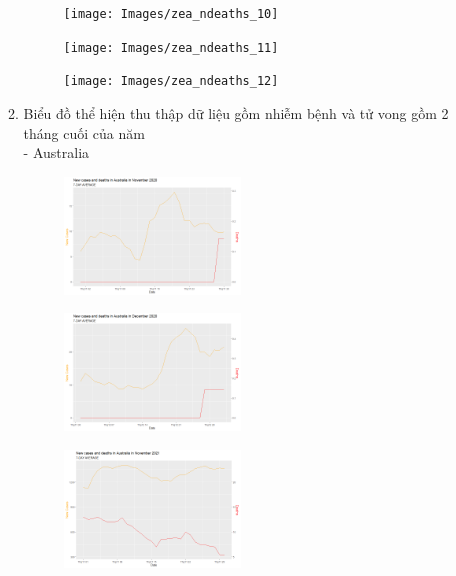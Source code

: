 \documentclass[a4paper]{article}
\theoremstyle{definition}
\begin{document}
\begin{enumerate}[i)]
\begin{enumerate}[1)]
		\begin{figure} [!htp]
  		\centering
  		\texttt{[image: Images/zea\_ndeaths\_10]}
		\end{figure}
		
		\begin{figure} [!htp]
  		\centering
  		\texttt{[image: Images/zea\_ndeaths\_11]}
		\end{figure}
		
		\begin{figure} [!htp]
  		\centering
  		\texttt{[image: Images/zea\_ndeaths\_12]}
		\end{figure}
    \item Biểu đồ thể hiện thu thập dữ liệu gồm nhiễm bệnh và tử vong gồm 2 tháng cuối của năm\\
        	- Australia\\
   	 	\begin{figure} [!htp]
  		\centering
  		\includegraphics [width=0.47\textwidth] {Images/aus_cad_9}
		\end{figure}
		
		\begin{figure} [!htp]
  		\centering
  		\includegraphics [width=0.47\textwidth] {Images/aus_cad_10}
		\end{figure}
		
		\begin{figure} [!htp]
  		\centering
  		\includegraphics [width=0.47\textwidth] {Images/aus_cad_11}
		\end{figure}
		

\end{enumerate}
\end{enumerate}
\end{document}
